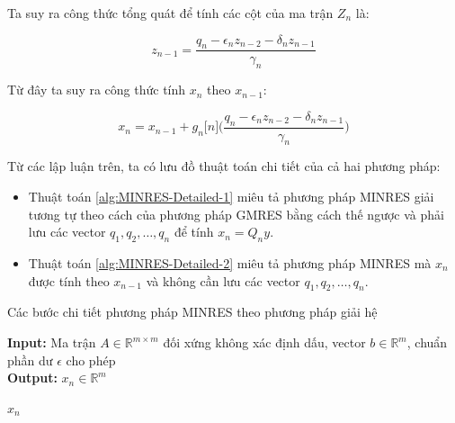 \documentclass[14pt, a4paper]{article}
\numberwithin{equation}{section}
\numberwithin{algorithm}{section}
\numberwithin{figure}{section}
\numberwithin{dl}{section}
\numberwithin{md}{section}
\numberwithin{bd}{section}
\numberwithin{dn}{section}
\begin{document}
Ta suy ra công thức tổng quát để tính các cột của ma trận $Z_n$ là:

\begin{equation}
	z_{n-1} = \dfrac{q_n - \epsilon_n z_{n-2} - \delta_n z_{n-1}}{\gamma_n}
\end{equation}

Từ đây ta suy ra công thức tính $x_n$ theo $x_{n-1}$:

\begin{equation} \label{eq:X-Recurrence}
    x_n = x_{n-1} + g_n\lbrack n \rbrack \Big(\dfrac{q_n - \epsilon_n z_{n-2} - \delta_n z_{n-1}}{\gamma_n}\Big)
\end{equation}

Từ các lập luận trên, ta có lưu đồ thuật toán chi tiết của cả hai phương pháp:

\begin{itemize}
    \item Thuật toán \ref{alg:MINRES-Detailed-1} miêu tả phương pháp MINRES giải tương tự theo cách của phương pháp GMRES bằng cách thế ngược và phải lưu các vector $q_1, q_2, \dots, q_n$ để tính $x_n = Q_n y$.
    \item Thuật toán \ref{alg:MINRES-Detailed-2} miêu tả phương pháp MINRES mà $x_n$ được tính theo $x_{n-1}$ và không cần lưu các vector $q_1, q_2, \dots, q_n$.
\end{itemize}

\begin{algorithm}[h!]
    \caption{Các bước chi tiết phương pháp MINRES theo phương pháp giải hệ}\label{alg:MINRES-Detailed-1}
    \hspace*{\algorithmicindent} \textbf{Input:} {Ma trận $A \in \mathbb{R}^{m \times m}$ đối xứng không xác định dấu, vector $b \in \mathbb{R}^m$, chuẩn phần dư $\epsilon$ cho phép} \\
    \hspace*{\algorithmicindent} \textbf{Output:} {$x_n \in \mathbb{R}^m$}
    \begin{algorithmic}
                \State \Return $x_n$
            \EndIf
        \EndFor
    \end{algorithmic}
\end{algorithm}
\end{document}
